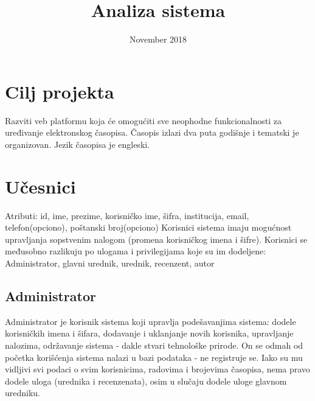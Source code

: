\documentclass[a4paper,14,4pt]{article}
\begin{document}
\title{Analiza sistema}
\date{November 2018}

\maketitle
\tableofcontents
\newpage



\section{Cilj projekta}

Razviti veb platformu koja će omogućiti sve neophodne funkcionalnosti za uređivanje elektronskog časopisa. Časopis izlazi dva puta godišnje i tematski je organizovan. Jezik časopisa je engleski.

\section{Učesnici}

    Atributi: id, ime, prezime, korisničko ime, šifra, institucija, email, telefon(opciono), poštanski broj(opciono)
    Korisnici sistema imaju mogućnost upravljanja sopstvenim nalogom (promena korisničkog imena i šifre). Korisnici se međusobno razlikuju po ulogama i privilegijama koje su im dodeljene: Administrator, glavni urednik, urednik, recenzent, autor

    \subsection{Administrator}
    Administrator je korisnik sistema koji upravlja podešavanjima sistema: dodele korisničkih imena i šifara, dodavanje i uklanjanje novih korisnika, upravljanje nalozima, održavanje sistema - dakle stvari tehnološke prirode. On se odmah od početka korišćenja sistema nalazi u bazi podataka - ne registruje se. Iako su mu vidljivi svi podaci o svim korisnicima, radovima i brojevima časopisa, nema pravo dodele uloga (urednika i recenzenata), osim u slučaju dodele uloge glavnom uredniku.
\end{document}
